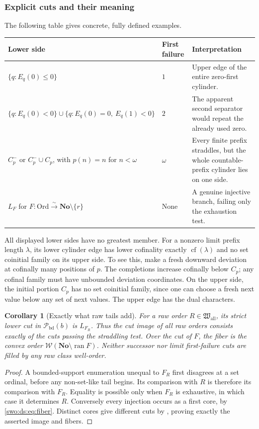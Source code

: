 \documentclass[11pt]{article}
\newtheorem{corollary}[corollary]{Corollary}
\theoremstyle{definition}
\theoremstyle{remark}
\newcommand{\No}{\mathbf{No}}
\newcommand{\Ord}{\mathrm{Ord}}
\newcommand{\WO}{\mathcal W}
\newcommand{\Hall}{\mathfrak W_{\mathrm{all}}}
\newcommand{\Pbd}{\mathcal P_{\mathrm{bd}}}
\newcommand{\ran}{\operatorname{ran}}
\newcommand{\cf}{\operatorname{cf}}
\begin{document}
\subsubsection{Explicit cuts and their meaning}

The following table gives concrete, fully defined examples.

\begin{longtable}{@{}>{\raggedright\arraybackslash}p{}>{\raggedright\arraybackslash}p{}>{\raggedright\arraybackslash}p{}@{}}
\toprule
Lower side & First failure & Interpretation\\
\midrule\endhead
$\{q:E_q(0)\le0\}$ & $1$ & Upper edge of the entire zero-first
cylinder.\\[5pt]
$\{q:E_q(0)<0\}\cup\{q:E_q(0)=0,\ E_q(1)<0\}$ & $2$ & The apparent
second separator would repeat the already used zero.\\[5pt]
$C_p^-$ or $C_p^-\cup C_p$, with $p(n)=n$ for $n<\omega$ & $\omega$ &
Every finite prefix straddles, but the whole countable-prefix cylinder
lies on one side.\\[5pt]
$L_F$ for $F:\Ord\overset{\sim}{\to}\No\setminus\{r\}$ & None &
A genuine injective branch, failing only the exhaustion test.\\
\bottomrule
\end{longtable}

All displayed lower sides have no greatest member. For a nonzero limit
prefix length $\lambda$, its lower cylinder edge has lower cofinality
exactly $\cf(\lambda)$ and no set coinitial family on its upper side.
To see this, make a fresh downward deviation at cofinally many positions
of $p$. The completions increase cofinally below $C_p$; any cofinal
family must have unbounded deviation coordinates. On the upper side,
the initial portion $C_p$ has no set coinitial family, since one can
choose a fresh next value below any set of next values. The upper
edge has the dual characters.

\begin{corollary}[Exactly what raw tails add]\label{swo:ds:cor:rawcutimage}
For a raw order $R\in \Hall$, its strict lower cut in $\Pbd(b)$ is
$L_{F_R}$. Thus the cut image of all raw orders consists exactly of
the cuts passing the straddling test. Over the cut of $F$, the fiber
is the convex order $\WO(\No\setminus\ran F)$.
Neither successor nor limit first-failure cuts are filled by any raw
class well-order.
\end{corollary}
\begin{proof}
A bounded-support enumeration unequal to $F_R$ first disagrees at a
set ordinal, before any non-set-like tail begins. Its comparison with
$R$ is therefore its comparison with $F_R$. Equality is possible
only when $F_R$ is exhaustive, in which case it determines $R$.
Conversely every injection occurs as a first core, by
\eqref{swo:ds:eq:fiber}. Distinct cores give different cuts by
, proving exactly the asserted image
and fibers.
\end{proof}
\end{document}
